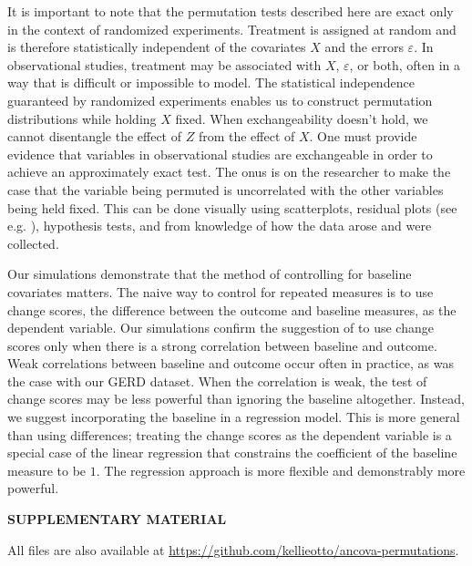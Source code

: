 \documentclass[12pt]{article}
\begin{document}
It is important to note that the permutation tests described here are exact only in the context of randomized experiments.
Treatment is assigned at random and is therefore statistically independent of the covariates $X$ and the errors $\varepsilon$.
In observational studies, treatment may be associated with $X$, $\varepsilon$, or both, often in a way that is difficult or impossible to model.
The statistical independence guaranteed by randomized experiments enables us to construct permutation distributions while holding $X$ fixed.
When exchangeability doesn't hold, we cannot disentangle the effect of $Z$ from the effect of $X$.
One must provide evidence that variables in observational studies are exchangeable in order to achieve an approximately exact test.
The onus is on the researcher to make the case that the variable being permuted is uncorrelated with the other variables being held fixed.
This can be done visually using scatterplots, residual plots (see e.g. \cite{freedman_nonstochastic_1983}), hypothesis tests, and from knowledge of how the data arose and were collected.

Our simulations demonstrate that the method of controlling for baseline covariates matters.
The naive way to control for repeated measures is to use change scores, the difference between the outcome and baseline measures, as the dependent variable.
Our simulations confirm the suggestion of \cite{frison_repeated_1992} to use change scores only when there is a strong correlation between baseline and outcome.
Weak correlations between baseline and outcome occur often in practice, as was the case with our GERD dataset.
When the correlation is weak, the test of change scores may be less powerful than ignoring the baseline altogether.
Instead, we suggest incorporating the baseline in a regression model.
This is more general than using differences;
treating the change scores as the dependent variable is a special case of the linear regression that constrains the coefficient of the baseline measure to be $1$.
The regression approach is more flexible and demonstrably more powerful.



\bigskip
\begin{center}
{\large\bf SUPPLEMENTARY MATERIAL}
\end{center}
All files are also available at \url{https://github.com/kellieotto/ancova-permutations}.
\end{document}
